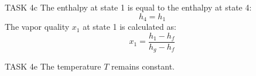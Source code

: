 TASK 4c  
The enthalpy at state 1 is equal to the enthalpy at state 4:  
\[
h_4 = h_1
\]  
The vapor quality \( x_1 \) at state 1 is calculated as:  
\[
x_1 = \frac{h_1 - h_f}{h_g - h_f}
\]  

TASK 4e  
The temperature \( T \) remains constant.